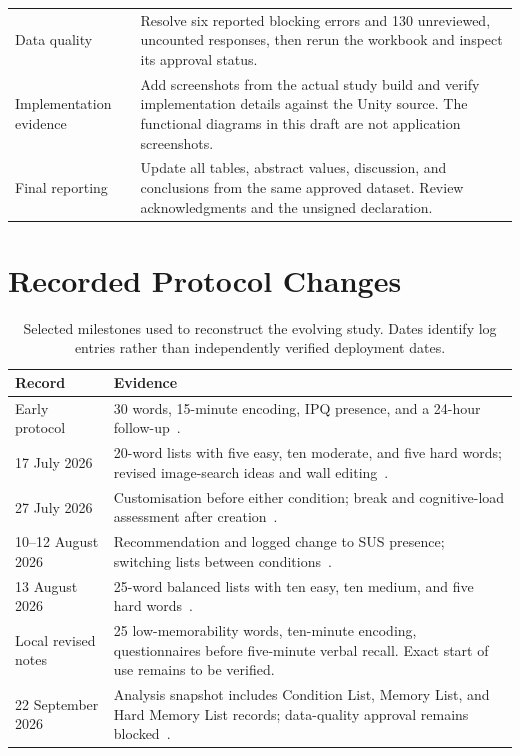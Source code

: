 \begin{longtable}{@{}p{3.5cm}p{11.2cm}@{}}
Data quality & Resolve six reported blocking errors and 130 unreviewed, uncounted responses, then rerun the workbook and inspect its approval status. \\
Implementation evidence & Add screenshots from the actual study build and verify implementation details against the Unity source. The functional diagrams in this draft are not application screenshots. \\
Final reporting & Update all tables, abstract values, discussion, and conclusions from the same approved dataset. Review acknowledgments and the unsigned declaration. \\
\bottomrule
\end{longtable}

\section{Recorded Protocol Changes}
\begin{table}[H]
\centering
\small
\caption{Selected milestones used to reconstruct the evolving study. Dates identify log entries rather than independently verified deployment dates.}
\begin{tabularx}{\textwidth}{@{}p{2.5cm}X@{}}
\toprule
Record & Evidence \\
\midrule
Early protocol & 30 words, 15-minute encoding, IPQ presence, and a 24-hour follow-up~\cite{sroorprotocol}. \\
17 July 2026 & 20-word lists with five easy, ten moderate, and five hard words; revised image-search ideas and wall editing~\cite{logjuly17}. \\
27 July 2026 & Customisation before either condition; break and cognitive-load assessment after creation~\cite{meetingjuly27}. \\
10--12 August 2026 & Recommendation and logged change to SUS presence; switching lists between conditions~\cite{meetingaug10,logaug12}. \\
13 August 2026 & 25-word balanced lists with ten easy, ten medium, and five hard words~\cite{logaug13}. \\
Local revised notes & 25 low-memorability words, ten-minute encoding, questionnaires before five-minute verbal recall. Exact start of use remains to be verified. \\
22 September 2026 & Analysis snapshot includes Condition List, Memory List, and Hard Memory List records; data-quality approval remains blocked~\cite{srooranalysis}. \\
\bottomrule
\end{tabularx}
\end{table}

